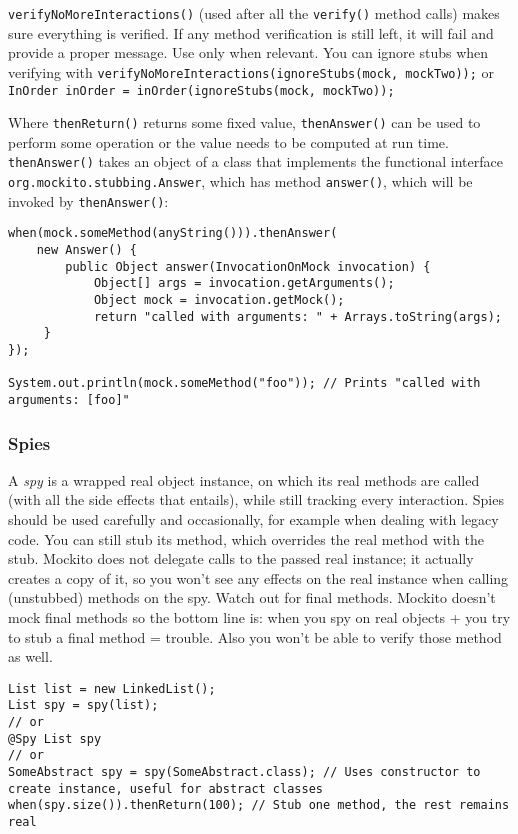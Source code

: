 \documentclass[8pt, table, xcdraw]{article}%
\begin{document}
\lstinline{verifyNoMoreInteractions()} (used after all the \lstinline{verify()} method calls) makes sure everything is verified. If any method verification is still left, it will fail and provide a proper message. Use only when relevant. You can ignore stubs when verifying with \lstinline{verifyNoMoreInteractions(ignoreStubs(mock, mockTwo));} or \lstinline{InOrder inOrder = inOrder(ignoreStubs(mock, mockTwo));}

Where \lstinline{thenReturn()} returns some fixed value, \lstinline{thenAnswer()} can be used to perform some operation or the value needs to be computed at run time. \lstinline{thenAnswer()} takes an object of a class that implements the functional interface \lstinline{org.mockito.stubbing.Answer}, which has method \lstinline{answer()}, which will be invoked by \lstinline{thenAnswer()}:

\begin{lstlisting}
when(mock.someMethod(anyString())).thenAnswer(
    new Answer() {
        public Object answer(InvocationOnMock invocation) {
            Object[] args = invocation.getArguments();
            Object mock = invocation.getMock();
            return "called with arguments: " + Arrays.toString(args);
     }
});

System.out.println(mock.someMethod("foo")); // Prints "called with arguments: [foo]"
\end{lstlisting}

\subsubsection{Spies}

A \emph{spy} is a wrapped real object instance, on which its real methods are called (with all the side effects that entails), while still tracking every interaction. Spies should be used carefully and occasionally, for example when dealing with legacy code. You can still stub its method, which overrides the real method with the stub. Mockito does not delegate calls to the passed real instance; it actually creates a copy of it, so you won't see any effects on the real instance when calling (unstubbed) methods on the spy. Watch out for final methods. Mockito doesn't mock final methods so the bottom line is: when you spy on real objects + you try to stub a final method = trouble. Also you won't be able to verify those method as well.

\begin{lstlisting}
List list = new LinkedList();
List spy = spy(list);
// or
@Spy List spy
// or
SomeAbstract spy = spy(SomeAbstract.class); // Uses constructor to create instance, useful for abstract classes
when(spy.size()).thenReturn(100); // Stub one method, the rest remains real
\end{lstlisting}
\end{document}

